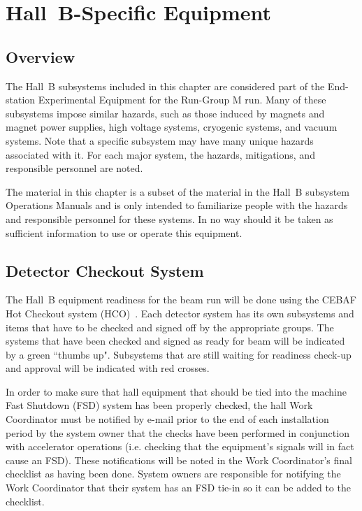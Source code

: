 \documentclass[12pt]{report}
\begin{document}
\chapter{Hall~B-Specific Equipment}

\section{Overview}

The Hall~B subsystems included in this chapter are considered part of the End-station 
Experimental Equipment for the Run-Group M run. Many of these subsystems impose 
similar hazards, such as those induced by magnets and magnet power supplies, high voltage 
systems, cryogenic systems, and vacuum systems. Note that a specific subsystem may have 
many unique hazards associated with it. For each major system, the hazards, mitigations, 
and responsible personnel are noted.

The material in this chapter is a subset of the material in the Hall~B subsystem Operations 
Manuals and is only intended to familiarize people with the hazards and responsible personnel 
for these systems. In no way should it be taken as sufficient information to use or operate 
this equipment.

\section{Detector Checkout System}

The Hall~B equipment readiness for the beam run will be done using the CEBAF Hot Checkout 
system (HCO)~\cite{hco}. Each detector system has its own subsystems and items that have 
to be checked and signed off by the appropriate groups. The systems that have been checked 
and signed as ready for beam will be indicated by a green ``thumbs up". Subsystems that are 
still waiting for readiness check-up and approval will be indicated with red crosses. 

In order to make sure that hall equipment that should be tied into the machine Fast Shutdown 
(FSD) system has been properly checked, the hall Work Coordinator must be notified by e-mail 
prior to the end of each installation period by the system owner that the checks have been 
performed in conjunction with accelerator operations (i.e. checking that the equipment's 
signals will in fact cause an FSD). These notifications will be noted in the Work Coordinator's 
final checklist as having been done. System owners are responsible for notifying the Work 
Coordinator that their system has an FSD tie-in so it can be added to the checklist.
\end{document}
